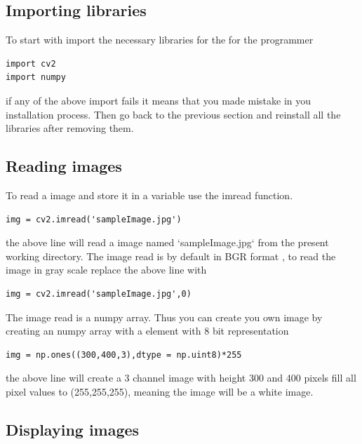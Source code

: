\documentclass[11pt]{article}
\begin{document}
\subsection*{Importing libraries}
\label{sec-7-1}
To start with import the necessary libraries for the for the programmer  
\begin{verbatim}
import cv2
import numpy
\end{verbatim}
if any of the above import fails it means that you made mistake in you installation  
process. Then go back to the previous section and reinstall all the libraries after  
removing them.  
\subsection*{Reading images}
\label{sec-7-2}
To read a image and store it in a variable use the imread function.  
\begin{verbatim}
img = cv2.imread('sampleImage.jpg')
\end{verbatim}
the above line will read a image named `sampleImage.jpg` from the present working directory.  
The image read is by default in BGR format , to read the image in gray scale replace the above  
line with  
\begin{verbatim}
img = cv2.imread('sampleImage.jpg',0)
\end{verbatim}
The image read is a numpy array. Thus you can create you own image by creating an numpy array  
with a element with 8 bit representation  
\begin{verbatim}
img = np.ones((300,400,3),dtype = np.uint8)*255
\end{verbatim}
the above line will create a 3 channel image with height 300 and 400 pixels fill all pixel values  
to (255,255,255), meaning the image will be a white image.  
\subsection*{Displaying images}
\label{sec-7-3}
\end{document}
